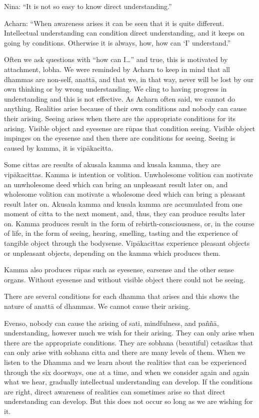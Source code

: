 Nina: ``It is not so easy to know direct understanding.''

Acharn: ``When awareness arises it can be seen that it is quite
different. Intellectual understanding can condition direct
understanding, and it keeps on going by conditions. Otherwise it is
always, how, how can `I' understand.''

Often we ask questions with ``how can I\ldots{}'' and true, this is
motivated by attachment, lobha. We were reminded by Acharn to keep in
mind that all dhammas are non-self, anattā, and that we, in that way,
never will be lost by our own thinking or by wrong understanding. We
cling to having progress in understanding and this is not effective. As
Acharn often said, we cannot do anything. Realities arise because of
their own conditions and nobody can cause their arising. Seeing arises
when there are the appropriate conditions for its arising. Visible
object and eyesense are rūpas that condition seeing. Visible object
impinges on the eyesense and then there are conditions for seeing.
Seeing is caused by kamma, it is vipākacitta.

Some cittas are results of akusala kamma and kusala kamma, they are
vipākacittas. Kamma is intention or volition. Unwholesome volition can
motivate an unwholesome deed which can bring an unpleasant result later
on, and wholesome volition can motivate a wholesome deed which can bring
a pleasant result later on. Akusala kamma and kusala kamma are
accumulated from one moment of citta to the next moment, and, thus, they
can produce results later on. Kamma produces result in the form of
rebirth-consciousness, or, in the course of life, in the form of seeing,
hearing, smelling, tasting and the experience of tangible object through
the bodysense. Vipākacittas experience pleasant objects or unpleasant
objects, depending on the kamma which produces them.

Kamma also produces rūpas such as eyesense, earsense and the other sense
organs. Without eyesense and without visible object there could not be
seeing.

There are several conditions for each dhamma that arises and this shows
the nature of anattā of dhammas. We cannot cause their arising.

Evenso, nobody can cause the arising of sati, mindfulness, and paññā,
understanding, however much we wish for their arising. They can only
arise when there are the appropriate conditions. They are sobhana
(beautiful) cetasikas that can only arise with sobhana citta and there
are many levels of them. When we listen to the Dhamma and we learn about
the realities that can be experienced through the six doorways, one at a
time, and when we consider again and again what we hear, gradually
intellectual understanding can develop. If the conditions are right,
direct awareness of realities can sometimes arise so that direct
understanding can develop. But this does not occur so long as we are
wishing for it.

